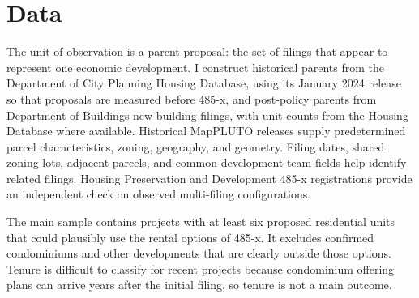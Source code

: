\section{Data}

The unit of observation is a parent proposal: the set of filings that appear to represent one economic development. I construct historical parents from the Department of City Planning Housing Database, using its January 2024 release so that proposals are measured before 485-x, and post-policy parents from Department of Buildings new-building filings, with unit counts from the Housing Database where available. Historical MapPLUTO releases supply predetermined parcel characteristics, zoning, geography, and geometry. Filing dates, shared zoning lots, adjacent parcels, and common development-team fields help identify related filings. Housing Preservation and Development 485-x registrations provide an independent check on observed multi-filing configurations.

The main sample contains projects with at least six proposed residential units that could plausibly use the rental options of 485-x. It excludes confirmed condominiums and other developments that are clearly outside those options. Tenure is difficult to classify for recent projects because condominium offering plans can arrive years after the initial filing, so tenure is not a main outcome.
